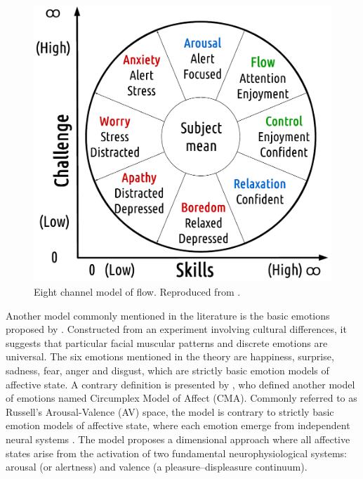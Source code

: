 \begin{figure}[h!]
    \centering
    \includegraphics[scale=0.3]{Content/figures/flow-eight.png}
    \caption{Eight channel model of flow. Reproduced from \textcite{nakamura2014concept}.}
    \label{fig:flow-eight}
\end{figure}

Another model commonly mentioned in the literature is the basic emotions proposed by \textcite{ekman1971constants}. Constructed from an experiment involving cultural differences, it suggests that particular facial muscular patterns and discrete emotions are universal. The six emotions mentioned in the theory are happiness, surprise, sadness, fear, anger and disgust, which are strictly basic emotion models of affective state. A contrary definition is presented by \textcite{russell1978evidence}, who defined another model of emotions named Circumplex Model of Affect (CMA). Commonly referred to as Russell's Arousal-Valence (AV) space, the model is contrary to strictly basic emotion models of affective state, where each emotion emerge from independent neural systems \parencite{posner2005circumplex}. The model proposes a dimensional approach where all affective states arise from the activation of two fundamental neurophysiological systems: arousal (or alertness) and valence (a pleasure–displeasure continuum).

